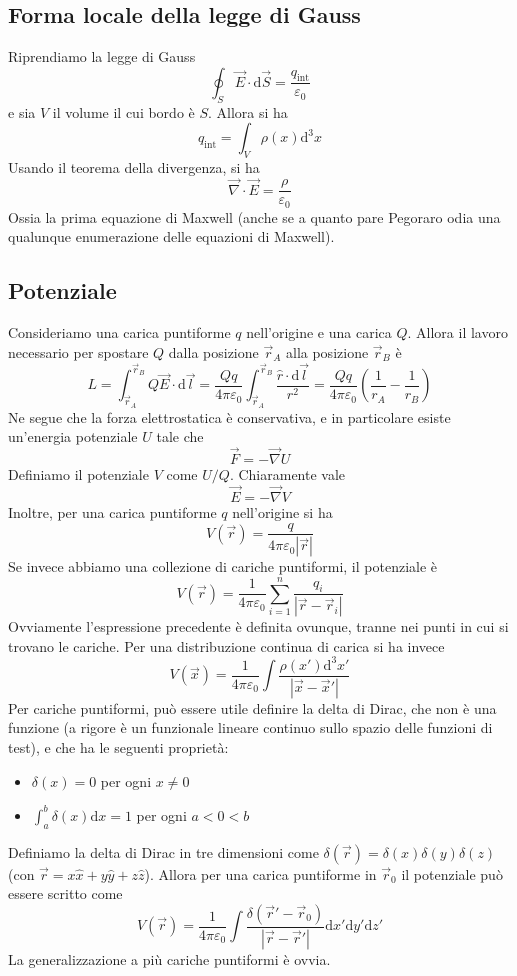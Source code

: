 \documentclass[a4paper,11pt]{book}
\let\oldnabla\nabla
\renewcommand{\nabla}{\vec{\oldnabla}}
\let\oldepsilon\epsilon
\let\oldvarepsilon\varepsilon
\renewcommand{\epsilon}{\oldvarepsilon}
\renewcommand{\varepsilon}{\oldepsilon}
\theoremstyle{definition}
\theoremstyle{theorem}
\begin{document}
	\subsection{Forma locale della legge di Gauss}
	Riprendiamo la legge di Gauss
	\[\oint_S\vec{E}\cdot\mathrm{d}\vec{S}=\frac{q_{\textrm{int}}}{\epsilon_0}\]
	e sia $V$ il volume il cui bordo è $S$. Allora si ha
	\[q_{\textrm{int}}=\int_V\rho(x)\mathrm{d}^3x\]
	Usando il teorema della divergenza, si ha
	\[\nabla\cdot\vec{E}=\frac{\rho}{\epsilon_0}\]
	Ossia la prima equazione di Maxwell (anche se a quanto pare Pegoraro odia una qualunque enumerazione delle equazioni di Maxwell).
	\subsection{Potenziale}
	Consideriamo una carica puntiforme $q$ nell'origine e una carica $Q$. Allora il lavoro necessario per spostare $Q$ dalla posizione $\vec{r}_A$ alla posizione $\vec{r}_B$ è
	\[L=\int_{\vec{r}_A}^{\vec{r}_B}Q\vec{E}\cdot\mathrm{d}\vec{l}=\frac{Qq}{4\pi\epsilon_0}\int_{\vec{r}_A}^{\vec{r}_B}\frac{\hat{r}\cdot\mathrm{d}\vec{l}}{r^2}=\frac{Qq}{4\pi\epsilon_0}\left(\frac{1}{r_A}-\frac{1}{r_B}\right)\]
	Ne segue che la forza elettrostatica è conservativa, e in particolare esiste un'energia potenziale $U$ tale che
	\[\vec{F}=-\nabla U\]
	Definiamo il potenziale $V$ come $U/Q$. Chiaramente vale
	\[\vec{E}=-\nabla V\]
	Inoltre, per una carica puntiforme $q$ nell'origine si ha
	\[V(\vec{r})=\frac{q}{4\pi\epsilon_0|\vec{r}|}\]
	Se invece abbiamo una collezione di cariche puntiformi, il potenziale è
	\[V(\vec{r})=\frac{1}{4\pi\epsilon_0}\sum_{i=1}^{n}\frac{q_i}{|\vec{r}-\vec{r}_i|}\]
	Ovviamente l'espressione precedente è definita ovunque, tranne nei punti in cui si trovano le cariche. Per una distribuzione continua di carica si ha invece
	\[V(\vec{x})=\frac{1}{4\pi\epsilon_0}\int\frac{\rho(x')\mathrm{d}^3x'}{|\vec{x}-\vec{x}'|}\]
	Per cariche puntiformi, può essere utile definire la delta di Dirac, che non è una funzione (a rigore è un funzionale lineare continuo sullo spazio delle funzioni di test), e che ha le seguenti proprietà:
	\begin{itemize}
		\item $\delta(x)=0$ per ogni $x\neq0$
		\item $\int_{a}^{b}\delta(x)\mathrm{d}x=1$ per ogni $a<0<b$
	\end{itemize}
	Definiamo la delta di Dirac in tre dimensioni come $\delta(\vec{r})=\delta(x)\delta(y)\delta(z)$ (con $\vec{r}=x\hat{x}+y\hat{y}+z\hat{z}$). Allora per una carica puntiforme in $\vec{r}_0$ il potenziale può essere scritto come
	\[V(\vec{r})=\frac{1}{4\pi\epsilon_0}\int\frac{\delta(\vec{r}'-\vec{r}_0)}{|\vec{r}-\vec{r}'|}\mathrm{d}x'\mathrm{d}y'\mathrm{d}z'\]
	La generalizzazione a più cariche puntiformi è ovvia.
\end{document}
